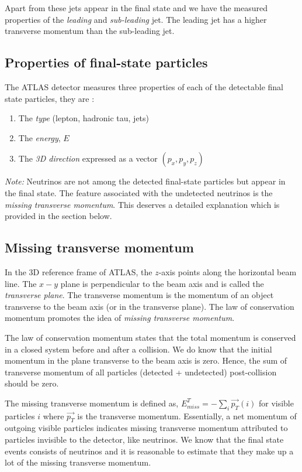 \documentclass[final,3p,times,twocolumn]{elsarticle}
\begin{document}
Apart from these jets appear in the final state and we have the measured properties of the \textit{leading} and \textit{sub-leading} jet. The leading jet has a higher transverse momentum than the sub-leading jet. 

\subsection{Properties of final-state particles}

The ATLAS detector measures three properties of each of the detectable final state particles, they are :

\begin{enumerate}[noitemsep]
\item{The \textit{type} (lepton, hadronic tau, jets)} \item{The \textit{energy}, $E$}
\item{The \textit{3D direction} expressed as a vector $(p_{x}, p_{y}, p_{z})$}
\end{enumerate}

\textit{Note:} Neutrinos are not among the detected final-state particles but appear in the final state. The feature associated with the undetected neutrinos is the \textit{missing transverse momentum}. This deserves a detailed explanation which is provided in the section below.

\subsection{Missing transverse momentum}
\label{missing}

In the 3D reference frame of ATLAS, the $z$-axis points along the horizontal beam line. The $x-y$ plane is perpendicular to the beam axis and is called the \textit{transverse plane}. The transverse momentum is the momentum of an object transverse to the beam axis (or in the transverse plane). The law of conservation momentum promotes the idea of \textit{missing transverse momentum}.

The law of conservation momentum states that the total momentum is conserved in a closed system before and after a collision. We do know that the initial momentum in the plane transverse to the beam axis is zero. Hence, the sum of transverse momentum of all particles (detected + undetected) post-collision should be zero. 

The missing transverse momentum is defined as, $E_{miss}^{T} =  - \sum_{i} \vec{p_{T}}(i) $ for visible particles $i$ where $\vec{p_{T}}$ is the transverse momentum. Essentially, a net momentum of outgoing visible particles indicates missing transverse momentum attributed to particles invisible to the detector, like neutrinos. We know that the final state events consists of neutrinos and it is reasonable to estimate that they make up a lot of the missing transverse momentum.
\end{document}
